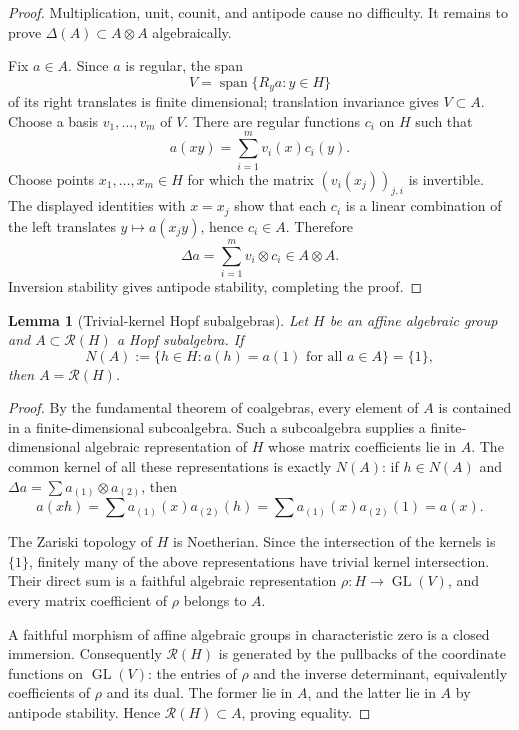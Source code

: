 \documentclass[11pt]{article}
\newtheorem{lemma}[theorem]{Lemma}
\newcommand{\Reg}{\mathcal R}
\begin{document}
\begin{proof}
Multiplication, unit, counit, and antipode cause no difficulty.  It remains
to prove $\Delta(A)\subset A\otimes A$ algebraically.

Fix $a\in A$.  Since $a$ is regular, the span
\[
 V=\operatorname{span}\{R_y a:y\in H\}
\]
of its right translates is finite dimensional; translation invariance gives
$V\subset A$.  Choose a basis $v_1,\dots,v_m$ of $V$.  There are regular
functions $c_i$ on $H$ such that
\[
 a(xy)=\sum_{i=1}^m v_i(x)c_i(y).
\]
Choose points $x_1,\dots,x_m\in H$ for which the matrix
$(v_i(x_j))_{j,i}$ is invertible.  The displayed identities with $x=x_j$
show that each $c_i$ is a linear combination of the left translates
$y\mapsto a(x_jy)$, hence $c_i\in A$.  Therefore
\[
 \Delta a=\sum_{i=1}^m v_i\otimes c_i\in A\otimes A.
\]
Inversion stability gives antipode stability, completing the proof.
\end{proof}

\begin{lemma}[Trivial-kernel Hopf subalgebras]
\label{lem:kernel}
Let $H$ be an affine algebraic group and $A\subset\Reg(H)$ a Hopf
subalgebra.  If
\[
 N(A):=\{h\in H:a(h)=a(1)\text{ for all }a\in A\}=\{1\},
\]
then $A=\Reg(H)$.
\end{lemma}

\begin{proof}
By the fundamental theorem of coalgebras, every element of $A$ is contained
in a finite-dimensional subcoalgebra.  Such a subcoalgebra supplies a
finite-dimensional algebraic representation of $H$ whose matrix
coefficients lie in $A$.  The common kernel of all these representations is
exactly $N(A)$: if $h\in N(A)$ and
$\Delta a=\sum a_{(1)}\otimes a_{(2)}$, then
\[
 a(xh)=\sum a_{(1)}(x)a_{(2)}(h)
      =\sum a_{(1)}(x)a_{(2)}(1)=a(x).
\]

The Zariski topology of $H$ is Noetherian.  Since the intersection of the
kernels is $\{1\}$, finitely many of the above representations have trivial
kernel intersection.  Their direct sum is a faithful algebraic
representation $\rho:H\to\operatorname{GL}(V)$, and every matrix coefficient
of $\rho$ belongs to $A$.

A faithful morphism of affine algebraic groups in characteristic zero is a
closed immersion.  Consequently $\Reg(H)$ is generated by the pullbacks of
the coordinate functions on $\operatorname{GL}(V)$: the entries of $\rho$
and the inverse determinant, equivalently coefficients of $\rho$ and its
dual.  The former lie in $A$, and the latter lie in $A$ by antipode
stability.  Hence $\Reg(H)\subset A$, proving equality.
\end{proof}
\end{document}
